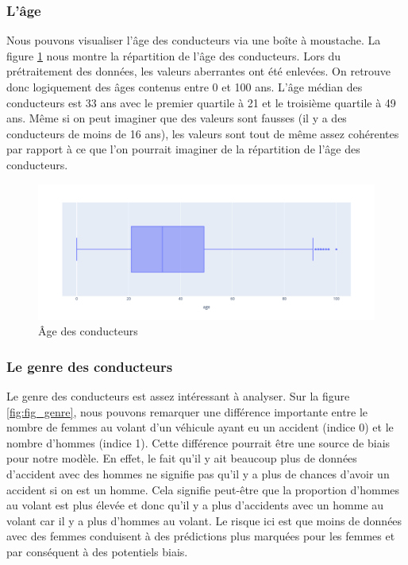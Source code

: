 \documentclass{article}
\begin{document}
    \subsubsection{L'âge}
    Nous pouvons visualiser l'âge des conducteurs via une boîte à moustache. La figure \ref{fig:fig_age} nous 
    montre la répartition de l'âge des conducteurs. Lors du prétraitement des données, les valeurs aberrantes 
    ont été enlevées. On retrouve donc logiquement des âges contenus entre 0 et 100 ans. L'âge médian des 
    conducteurs est 33 ans avec le premier quartile à 21 et le troisième quartile à 49 ans. Même si on peut 
    imaginer que des valeurs sont fausses (il y a des conducteurs de moins de 16 ans), les valeurs sont tout de 
    même assez cohérentes par rapport à ce que l'on pourrait imaginer de la répartition de l'âge des conducteurs.

    \begin{figure}[ht]
        \centering
        \includegraphics[width=12cm]{./img/age.png}
        \caption{Âge des conducteurs}\label{fig:fig_age}
    \end{figure}

    \subsubsection{Le genre des conducteurs}
    Le genre des conducteurs est assez intéressant à analyser. Sur la figure \ref{fig:fig_genre}, nous pouvons 
    remarquer une différence importante entre le nombre de femmes au volant d'un véhicule ayant eu un accident 
    (indice 0) et le nombre d'hommes (indice 1). Cette différence pourrait être une source de biais pour notre modèle. 
    En effet, le fait qu'il y ait beaucoup plus de données d'accident avec des hommes ne signifie pas qu'il y a plus 
    de chances d'avoir un accident si on est un homme. Cela signifie peut-être que la proportion d'hommes au volant 
    est plus élevée et donc qu'il y a plus d'accidents avec un homme au volant car il y a plus d'hommes au volant. Le 
    risque ici est que moins de données avec des femmes conduisent à des prédictions plus marquées pour les femmes et 
    par conséquent à des potentiels biais.
\end{document}
